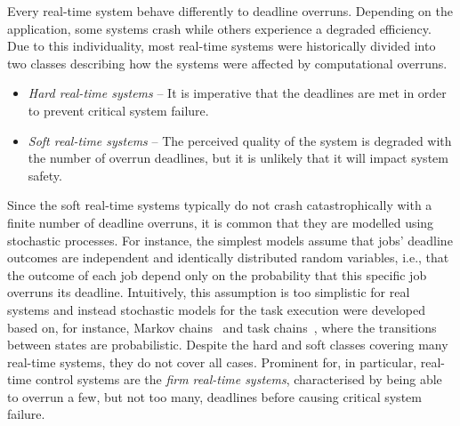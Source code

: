 Every real-time system behave differently to deadline overruns.
Depending on the application, some systems crash while others experience a degraded efficiency.
Due to this individuality, most real-time systems were historically divided into two classes describing how the systems were affected by computational overruns.
%
\begin{itemize}
    \item \emph{Hard real-time systems} -- It is imperative that the deadlines are met in order to prevent critical system failure.

    \item \emph{Soft real-time systems} -- The perceived quality of the system is degraded with the number of overrun deadlines, but it is unlikely that it will impact system safety.
\end{itemize}
%
Since the soft real-time systems typically do not crash catastrophically with a finite number of deadline overruns, it is common that they are modelled using stochastic processes.
For instance, the simplest models assume that jobs' deadline outcomes are independent and identically distributed random variables, i.e., that the outcome of each job depend only on the probability that this specific job overruns its deadline.
Intuitively, this assumption is too simplistic for real systems and instead stochastic models for the task execution were developed based on, for instance, Markov chains~\cite{Liu:2005, Friebe:2022, Abeni:2017} and task chains~\cite{Manolache:2004, Liu:2010}, where the transitions between states are probabilistic.
Despite the hard and soft classes covering many real-time systems, they do not cover all cases.
Prominent for, in particular, real-time control systems are the \emph{firm real-time systems}, characterised by being able to overrun a few, but not too many, deadlines before causing critical system failure.

